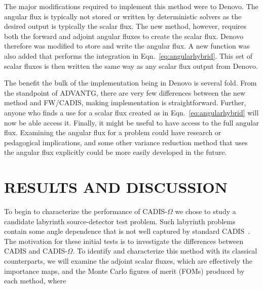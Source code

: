 \documentclass[12pt]{article}
\begin{document}

The major modifications required to implement this method were to Denovo. 
The angular flux is typically not stored or written by deterministic solvers as the desired output is typically the scalar flux.
The new method, however, requires both the forward and adjoint angular fluxes to create the scalar flux. 
Denovo therefore was modified to store and write the angular flux.
A new function was also added that performs the integration in Eqn.~\eqref{eq:angularhybrid}. 
This set of scalar fluxes is then written the same way as any scalar flux output from Denovo.

The benefit the bulk of the implementation being in Denovo is several fold. 
From the standpoint of ADVANTG, there are very few differences between the new method and FW/CADIS, making implementation is straightforward.
Further, anyone who finds a use for a scalar flux created as in Eqn.~\eqref{eq:angularhybrid} will now be able  access it.
Finally, it might be useful to have access to the full angular flux. 
Examining the angular flux for a problem could have research or pedagogical implications, and some other variance reduction method that uses the angular flux explicitly could be more easily developed in the future.

%
\section{RESULTS AND DISCUSSION} 
\label{sect::results}


To begin to characterize the performance of CADIS-$\Omega$ we chose to study a candidate labyrinth source-detector test problem.
Such labyrinth problems contain some angle dependence that is not well captured by standard CADIS~\cite{Peplow-ORNL}. 
The motivation for these initial tests is to investigate the differences between CADIS and CADIS-$\Omega$. To identify and characterize this method with its classical counterparts, 
we will examine the adjoint scalar fluxes, which are effectively the importance maps, and the Monte Carlo figures of merit (FOMs) produced by each method, where 
\end{document}
